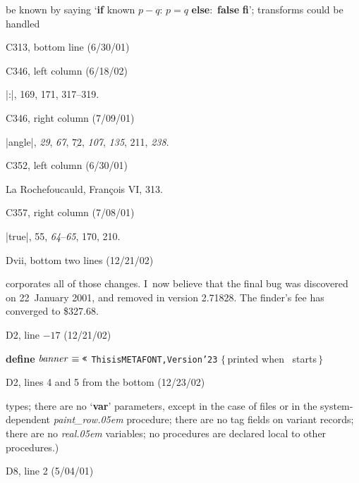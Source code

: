 {\ninepoint\noindent
be known by saying `{\bf if\/} known $p-q$: $p=q$ {\bf else}:~{\bf false}
{\bf fi}'; transforms could be handled\cutpar

\bugonpage C313, bottom line (6/30/01)


\bugonpage C346, left column (6/18/02)

\eightpoint\noindent
\llap{*}|:|, 169, 171, 317--319.

\bugonpage C346, right column (7/09/01)

\eightpoint\noindent
\llap{*}|angle|, {\it29}, {\it67}, $\underline{72}$, {\it107},
{\it135}, 211, {\it238}.

\bugonpage C352, left column (6/30/01)

\eightpoint\noindent
La Rochefoucauld, Fran\c cois VI, 313.

\bugonpage C357, right column (7/08/01)

\eightpoint\noindent
\llap{*}|true|, 55, {\it64\/}--{\it65}, 170, 210.

\def\\#1{\hbox{\it#1\/\kern.05em}} %
\def\to{\mathrel{.\,.}} %

\bugonpage Dvii, bottom two lines (12/21/02)

\eightpoint\noindent
corporates all of those changes.
I~now believe that the final bug was discovered on 22~January 2001,
and removed in version 2.71828.
The finder's fee has converged to \$327.68.

\hsize=35pc

\bugonpage D2, line $-17$ (12/21/02)

\ninepoint\noindent
{\bf define} $\\{banner}\equiv\hbox{\tt\char'23}$%
{\tt This\]is\]METAFONT,\]Version\char'23}\quad
$\{\,$printed when \MF\ starts$\,\}$

\bugonpage D2, lines 4 and 5 from the bottom (12/23/02)

\tenpoint\noindent
types; there are no `{\bf var}' parameters, except in the case of files
or in the system-dependent \\{paint\_row} procedure;
there are no tag fields on variant records; there are no \\{real} variables;
no procedures are declared local to other procedures.)

\bugonpage D8, line 2 (5/04/01)

}
